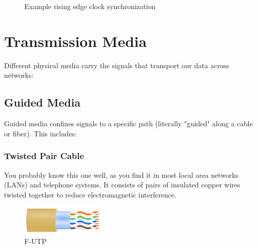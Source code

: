 \begin{figure}[h]
    \centering
    \caption{Example rising edge clock synchronization}\label{fig:clock_sync}
\end{figure}
\vfill
\newpage
\section*{Transmission Media}
Different physical media carry the signals that transport our data across networks:

\subsection*{Guided Media}
Guided media confines signals to a specific path (literally "guided" along a cable or fiber). This includes:

\subsubsection*{Twisted Pair Cable}
You probably know this one well, as you find it in most local area networks (LANs) and telephone systems. It consists of pairs of insulated copper wires twisted together to reduce electromagnetic interference.

\begin{figure}[h]
    \centering
    \includegraphics[width=4cm]{assets/osi/physical/f-utp.png}
    \caption{F-UTP}\label{fig:twisted_pair}
\end{figure}

